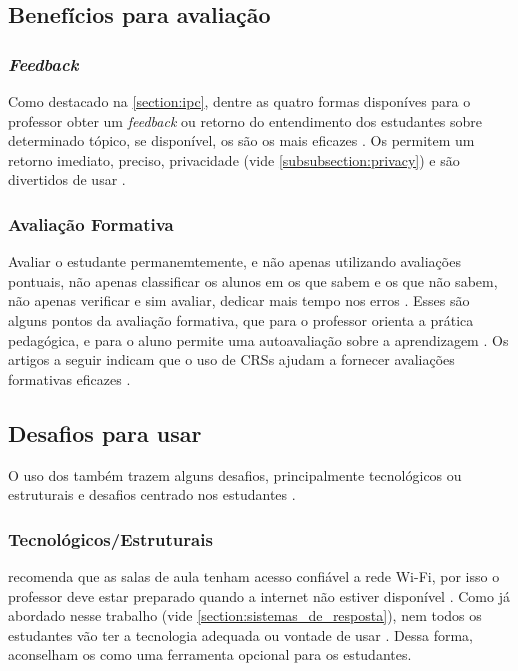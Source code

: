 \subsection{Benefícios para avaliação}

\subsubsection{\textit{Feedback}}
Como destacado na \autoref{section:ipc}, dentre as quatro formas disponíves para
o professor obter um \textit{feedback} ou retorno do entendimento dos estudantes
sobre determinado tópico, se disponível, os {\clickers} são os mais eficazes \cite{Crouch2007}.
Os {\clickers} permitem um retorno imediato, preciso, privacidade (vide \autoref{subsubsection:privacy}) e
são divertidos de usar \cite{Rana2016, Blood2013, Caldwell2007}.

\subsubsection{Avaliação Formativa}
Avaliar o estudante permanemtemente, e não apenas utilizando avaliações pontuais,
não apenas classificar os alunos em os que sabem e os que não sabem, não apenas
verificar e sim avaliar, dedicar mais tempo nos erros \cite{UnivespTV2013}. Esses são alguns pontos
da avaliação formativa, que para o professor orienta a prática pedagógica, e para
o aluno permite uma autoavaliação sobre a aprendizagem \cite{Kay2009}. Os artigos
a seguir indicam que o uso de CRSs ajudam a
fornecer avaliações formativas eficazes \cite{Kortemeyer2016, Thampy2014, Kay2009, Fies2006}.

\subsection{Desafios para usar {\clickers}}
O uso dos {\clickers} também trazem alguns desafios, principalmente
tecnológicos ou estruturais e desafios centrado nos estudantes \cite{Cubric2015, Kay2009}.

\subsubsection{Tecnológicos/Estruturais}
 recomenda que as salas de aula tenham acesso confiável
a rede Wi-Fi, por isso o professor deve estar preparado quando a internet não
estiver disponível \cite{Strasser2010}. Como já abordado nesse trabalho (vide \autoref{section:sistemas_de_resposta}),
nem todos os estudantes vão ter a tecnologia adequada ou vontade de usar \cite{Morrell2015, Stowell2015}.
Dessa forma,  aconselham os {\clickers} como uma ferramenta opcional para
os estudantes.

